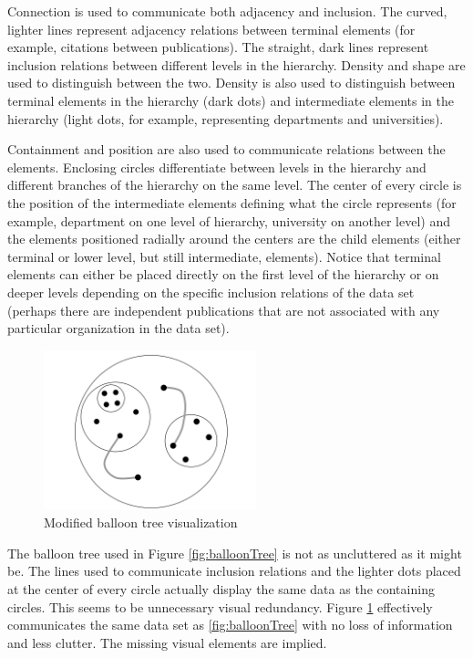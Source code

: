 Connection is used to communicate both adjacency and inclusion. The curved, lighter lines represent adjacency relations between terminal elements (for example, citations between publications). The straight, dark lines represent inclusion relations between different levels in the hierarchy. Density and shape are used to distinguish between the two. Density is also used to distinguish between terminal elements in the hierarchy (dark dots) and intermediate elements in the hierarchy (light dots, for example, representing departments and universities). 

Containment and position are also used to communicate relations between the elements. Enclosing circles differentiate between levels in the hierarchy and different branches of the hierarchy on the same level. The center of every circle is the position of the intermediate elements defining what the circle represents (for example, department on one level of hierarchy, university on another level) and the elements positioned radially around the centers are the child elements (either terminal or lower level, but still intermediate, elements). Notice that terminal elements can either be placed directly on the first level of the hierarchy or on deeper levels depending on the specific inclusion relations of the data set (perhaps there are independent publications that are not associated with any particular organization in the data set).

\begin{figure}[htb]
\centering
\includegraphics[width=0.55\textwidth]{vijay_balloon.png}
\caption{Modified balloon tree visualization}
\label{fig:balloon}
\end{figure}

The balloon tree used in Figure \ref{fig:balloonTree} is not as uncluttered as it might be. The lines used to communicate inclusion relations and the lighter dots placed at the center of every circle actually display the same data as the containing circles. This seems to be unnecessary visual redundancy. Figure \ref{fig:balloon} effectively communicates the same data set as \ref{fig:balloonTree} with no loss of information and less clutter. The missing visual elements are implied.

